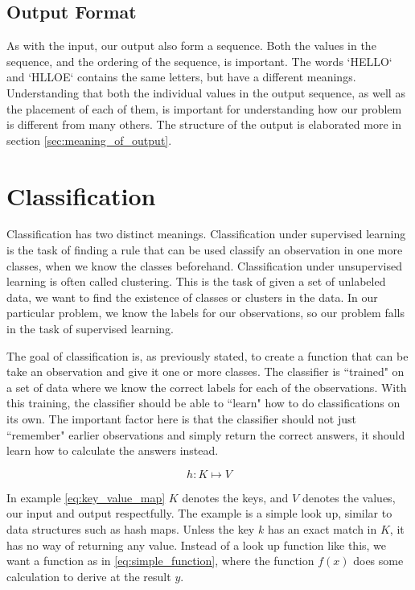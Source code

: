 \subsection{Output Format}
As with the input, our output also form a sequence. Both the values in the sequence, and the ordering of the sequence, is important. The words `HELLO` and `HLLOE` contains the same letters, but have a different meanings. Understanding that both the individual values in the output sequence, as well as the placement of each of them, is important for understanding how our problem is different from many others. The structure of the output is elaborated more in section \ref{sec:meaning_of_output}.


\section{Classification}
\label{sec:classification_explanation}
Classification has two distinct meanings. Classification under supervised learning is the task of finding a rule that can be used classify an observation in one more classes, when we know the classes beforehand. Classification under unsupervised learning is often called clustering. This is the task of given a set of unlabeled data, we want to find the existence of classes or clusters in the data. In our particular problem, we know the labels for our observations, so our problem falls in the task of supervised learning.

The goal of classification is, as previously stated, to create a function that can be take an observation and give it one or more classes. The classifier is ``trained" on a set of data where we know the correct labels for each of the observations. With this training, the classifier should be able to ``learn" how to do classifications on its own. The important factor here is that the classifier should not just ``remember" earlier observations and simply return the correct answers, it should learn how to calculate the answers instead. 

\begin{equation}
    \label{eq:key_value_map}
    h: K \mapsto V
\end{equation}

In example \ref{eq:key_value_map} $K$ denotes the keys, and $V$ denotes the values, our input and output respectfully. The example is a simple look up, similar to data structures such as hash maps. Unless the key $k$ has an exact match in $K$, it has no way of returning any value. Instead of a look up function like this, we want a function as in \ref{eq:simple_function}, where the function $f(x)$ does some calculation to derive at the result $y$.


